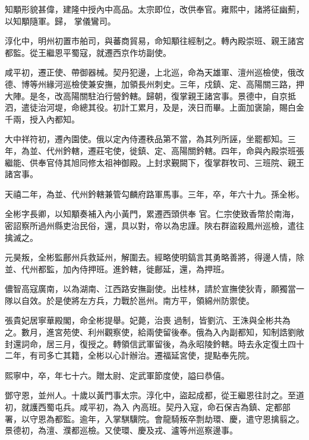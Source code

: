 \begin{pinyinscope}
 知顒形貌甚偉，建隆中授內中高品。太宗即位，改供奉官。雍熙中，諸將征幽薊，以知顒隨軍。歸，
 掌儀鸞司。



 淳化中，明州初置市舶司，與蕃商貿易，命知顒往經制之。轉內殿崇班、親王諸宮都監。從王繼恩平蜀寇，就遷西京作坊副使。



 咸平初，遷正使、帶御器械。契丹犯邊，上北巡，命為天雄軍、澶州巡檢使，俄改德、博等州緣河巡檢使兼安撫，加領長州刺史。三年，戍鎮、定、高陽關三路，押大陣。是冬，改高陽關駐泊行營鈐轄。歸朝，復掌親王諸宮事。景德中，自京抵泗，遣徒治河堤，命總其役。初計工累月，及是，浹日而畢。上面加褒諭，賜白金
 千兩，授入內都知。



 大中祥符初，遷內園使。俄以定內侍遷秩品第不當，為其列所誣，坐罷都知。三年，為並、代州鈐轄，遷莊宅使，徙鎮、定、高陽關鈐轄。四年，命與內殿崇班張繼能、供奉官侍其旭同修太祖神御殿。上封求覲闕下，復掌群牧司、三班院、親王諸宮事。



 天禧二年，為並、代州鈐轄兼管勾麟府路軍馬事。三年，卒，年六十九。孫全彬。



 全彬字長卿，以知顒奏補入內小黃門，累遷西頭供奉
 官。仁宗使致香幣於南海，密詔察所過州縣吏治民俗，還，具以對，帝以為忠謹。陜右群盜殺鳳州巡檢，遣往擒滅之。



 元昊叛，全彬監鄜州兵救延州，解圍去。經略使明鎬言其勇略善將，得邊人情，除並、代州都監，加內侍押班。進鈐轄，徙鄜延，還，為押班。



 儂智高寇廣南，以為湖南、江西路安撫副使。出桂林，請於宣撫使狄青，願獨當一隊以自效。於是使將左方兵，力戰於邕州。南方平，領綿州防禦使。



 張貴妃居寧華殿閣，命全彬提舉。妃薨，治喪
 過制，皆劉沆、王洙與全彬共為之。數月，進宮苑使、利州觀察使，給兩使留後奉。俄為入內副都知，知制誥劉敞封還詞命，居三月，復授之。轉領信武軍留後，為永昭陵鈐轄。時去永定復土四十二年，有司多亡其籍，全彬以心計辦治。遷福延宮使，提點奉先院。



 熙寧中，卒，年七十六。贈太尉、定武軍節度使，謚曰恭僖。



 鄧守恩，並州人。十歲以黃門事太宗。淳化中，盜起成都，從王繼恩往討之。至道初，就護西蜀屯兵。咸平初，為入
 內高班。契丹入寇，命石保吉為鎮、定都部署，以守恩為都監。逾年，入掌騏驥院。會龍騎叛卒剽劫環、慶，遣守恩擒翦之。景德初，為澶、濮都巡檢。又使環、慶及戎、瀘等州巡察邊事。




\end{pinyinscope}
